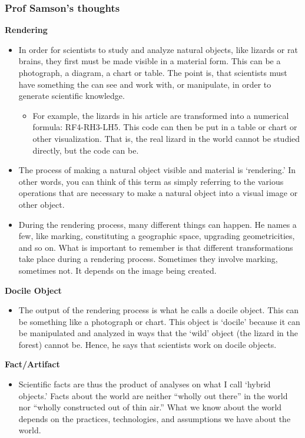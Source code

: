 \documentclass[a4paper]{article}
\begin{document}
\subsubsection{Prof Samson's thoughts}
\noindent\textbf{Rendering}
\begin{itemize}
	\item In order for scientists to study and analyze natural objects, like lizards or rat brains, they first must be made visible in a material form. This can be a photograph, a diagram, a chart or table. The point is, that scientists must have something the can see and work with, or manipulate, in order to generate scientific knowledge.
	\begin{itemize}[label=$\circ$]
		\item For example, the lizards in his article are transformed into a numerical formula: RF4-RH3-LH5. This code can then be put in a table or chart or other visualization. That is, the real lizard in the world cannot be studied directly, but the code can be.  
	\end{itemize} 
	\item The process of making a natural object visible and material is ‘rendering.’ In other words, you can think of this term as simply referring to the various operations that are necessary to make a natural object into a visual image or other object. 
	\item During the rendering process, many different things can happen. He names a few, like marking, constituting a geographic space, upgrading geometricities, and so on. What is important to remember is that different transformations take place during a rendering process. Sometimes they involve marking, sometimes not. It depends on the image being created. 
\end{itemize}
\noindent\textbf{Docile Object}
\begin{itemize}
	\item The output of the rendering process is what he calls a docile object. This can be something like a photograph or chart. This object is ‘docile’ because it can be manipulated and analyzed in ways that the ‘wild’ object (the lizard in the forest) cannot be. Hence, he says that scientists work on docile objects.  
\end{itemize}
\noindent\textbf{Fact/Artifact}
\begin{itemize}
	\item Scientific facts are thus the product of analyses on what I call ‘hybrid objects.’ Facts about the world are neither “wholly out there” in the world nor “wholly constructed out of thin air.” What we know about the world depends on the practices, technologies, and assumptions we have about the world.
\end{itemize}
\end{document}
